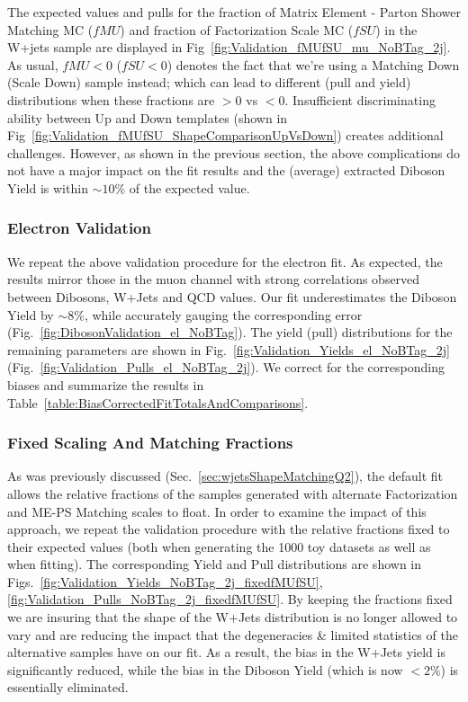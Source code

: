 The expected values and pulls for the fraction of Matrix Element -
Parton Shower Matching MC ($fMU$) and fraction of Factorization Scale
MC ($fSU$) in the W+jets sample are displayed in
Fig~\ref{fig:Validation_fMUfSU_mu_NoBTag_2j}.
As usual, $fMU<0$ ($fSU<0$) denotes the fact that we're using a
Matching Down (Scale Down) sample instead; which can lead to different
(pull and yield) distributions when these fractions are $>0$ vs
$<0$. Insufficient discriminating ability between Up and
Down templates (shown in
Fig~\ref{fig:Validation_fMUfSU_ShapeComparisonUpVsDown}) creates additional
challenges. However, as shown in the previous
section, the above complications do not have a major impact on the fit results and the (average) 
extracted Diboson Yield is within $\sim 10\%$ of the expected value.


\subsubsection{Electron Validation}
We repeat the above validation procedure for the electron fit. As expected, the results mirror those in the
 muon channel with strong correlations observed between Dibosons, W+Jets and QCD
values. Our fit underestimates the Diboson Yield by $\sim 8\%$, while accurately gauging the corresponding error (Fig.~\ref{fig:DibosonValidation_el_NoBTag}). 
The yield (pull) distributions for the remaining parameters are shown in Fig.~\ref{fig:Validation_Yields_el_NoBTag_2j} (Fig.~\ref{fig:Validation_Pulls_el_NoBTag_2j}). 
We correct for the corresponding biases and summarize the results in Table~\ref{table:BiasCorrectedFitTotalsAndComparisons}.


\subsubsection{Fixed Scaling And Matching Fractions}
\label{sec:FitValidation_fixedfMUfSU}
As was previously discussed (Sec.~\ref{sec:wjetsShapeMatchingQ2}), the default fit allows the relative
fractions of the samples generated with alternate Factorization and ME-PS Matching scales to float. In order to
examine the impact of this approach, we repeat the validation procedure with the relative fractions fixed
to their expected values (both when generating the 1000 toy datasets as well as when fitting). The corresponding
Yield and Pull distributions are shown in Figs.~\ref{fig:Validation_Yields_NoBTag_2j_fixedfMUfSU},
\ref{fig:Validation_Pulls_NoBTag_2j_fixedfMUfSU}. By keeping the fractions fixed we
are insuring that the shape of the W+Jets distribution is no longer allowed to vary and are reducing
the impact that the degeneracies \& limited statistics of the alternative samples have on our fit.
As a result, the bias in the W+Jets yield is significantly reduced, while the bias in the Diboson Yield 
(which is now $<2\%$) is essentially eliminated.


